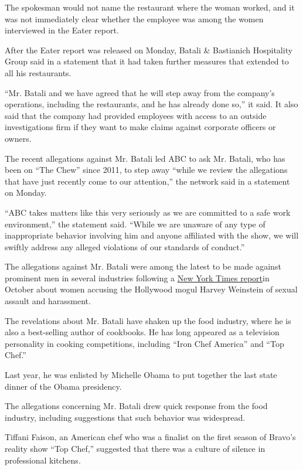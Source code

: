 The spokesman would not name the restaurant where the woman worked, and
it was not immediately clear whether the employee was among the women
interviewed in the Eater report.

After the Eater report was released on Monday, Batali \& Bastianich
Hospitality Group said in a statement that it had taken further measures
that extended to all his restaurants.

``Mr. Batali and we have agreed that he will step away from the
company's operations, including the restaurants, and he has already done
so,'' it said. It also said that the company had provided employees with
access to an outside investigations firm if they want to make claims
against corporate officers or owners.

The recent allegations against Mr. Batali led ABC to ask Mr. Batali, who
has been on ``The Chew'' since 2011, to step away ``while we review the
allegations that have just recently come to our attention,'' the network
said in a statement on Monday.

``ABC takes matters like this very seriously as we are committed to a
safe work environment,'' the statement said. ``While we are unaware of
any type of inappropriate behavior involving him and anyone affiliated
with the show, we will swiftly address any alleged violations of our
standards of conduct.''

The allegations against Mr. Batali were among the latest to be made
against prominent men in several industries following a
\href{https://www.nytimes.com/2017/10/05/us/harvey-weinstein-harassment-allegations.html}{New
York Times report}in October about women accusing the Hollywood mogul
Harvey Weinstein of sexual assault and harassment.

The revelations about Mr. Batali have shaken up the food industry, where
he is also a best-selling author of cookbooks. He has long appeared as a
television personality in cooking competitions, including ``Iron Chef
America'' and ``Top Chef.''

Last year, he was enlisted by Michelle Obama to put together the last
state dinner of the Obama presidency.

The allegations concerning Mr. Batali drew quick response from the food
industry, including suggestions that such behavior was widespread.

Tiffani Faison, an American chef who was a finalist on the first season
of Bravo's reality show ``Top Chef,'' suggested that there was a culture
of silence in professional kitchens.

